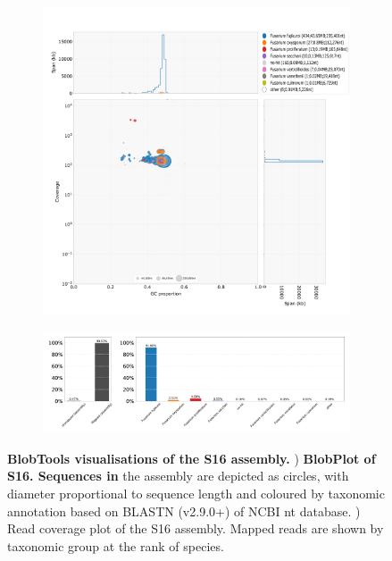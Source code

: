 \begin{figure}[hp!]
    \centering
    \begin{subfigure}[]{0.99\textwidth}
        \centering
        \includegraphics[width=\textwidth]{Figures/TNAU_S16.species.blobplot.pdf}
        \caption{}
        \label{fig:BlobPlot-S16}
    \end{subfigure}
    \begin{subfigure}[]{0.9\textwidth}
        \centering
        \includegraphics[width=\textwidth]{Figures/TNAU_S16.blobtools.blobDB.json.bestsum.species.p8.span.100.blobplot.read_cov.bam0.pdf}
        \caption{}
        \label{fig:BlobPlot_readcov-S16}
    \end{subfigure}
    \caption[BlobTools visualisations of the S16 assembly]{\textbf{BlobTools visualisations of the S16 assembly.}
        )\textbf{ BlobPlot of S16. Sequences in }the assembly are depicted as circles, with diameter proportional to sequence length and coloured by taxonomic annotation based on BLASTN (v2.9.0+) of NCBI nt database.
        \textbf{}) Read coverage plot of the S16 assembly. Mapped reads are shown by taxonomic group at the rank of species.}
        \label{fig:S16:BlobTools}
\end{figure}
